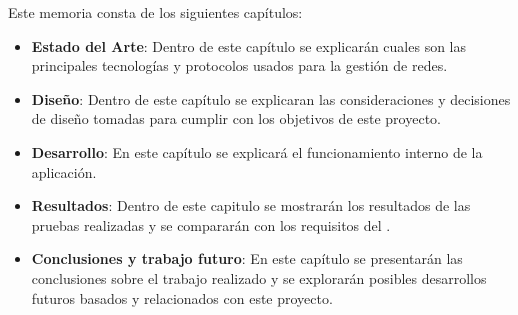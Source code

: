Este memoria consta de los siguientes capítulos:
\begin{itemize}
    \item\textbf{Estado del Arte}: Dentro de este capítulo se explicarán cuales son las principales tecnologías y protocolos usados para la gestión de redes.
    \item\textbf{Diseño}: Dentro de este capítulo se explicaran las consideraciones y decisiones de diseño tomadas para cumplir con los objetivos de este proyecto.
    \item\textbf{Desarrollo}: En este capítulo se explicará el funcionamiento interno de la aplicación.
    \item\textbf{Resultados}: Dentro de este capitulo se mostrarán los resultados de las pruebas realizadas y se compararán con los requisitos del \cite{RFC8641}.
    \item\textbf{Conclusiones y trabajo futuro}: En este capítulo se presentarán las conclusiones sobre el trabajo realizado y se explorarán posibles desarrollos futuros basados y relacionados con este proyecto. 
\end{itemize}
